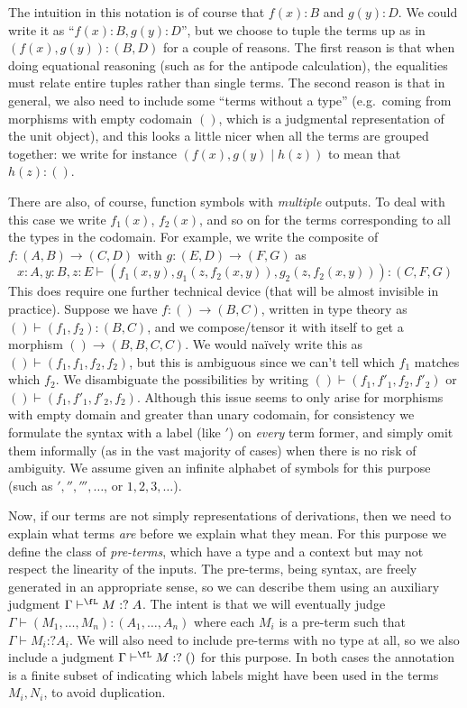 \documentclass{book}
\let\types\vdash
\newcommand{\pc}{\mathrel{\mathord{:}?}}
\begin{document}
The intuition in this notation is of course that $f(x):B$ and $g(y):D$.
We could write it as ``$f(x):B,g(y):D$'', but we choose to tuple the terms up as in $(f(x),g(y)):(B,D)$ for a couple of reasons.
The first reason is that when doing equational reasoning (such as for the antipode calculation), the equalities must relate entire tuples rather than single terms.
The second reason is that in general, we also need to include some ``terms without a type'' (e.g.\ coming from morphisms with empty codomain $()$, which is a judgmental representation of the unit object), and this looks a little nicer when all the terms are grouped together: we write for instance $(f(x),g(y)\mid h(z))$ to mean that $h(z):()$.

There are also, of course, function symbols with \emph{multiple} outputs.
To deal with this case we write $f_1(x)$, $f_2(x)$, and so on for the terms corresponding to all the types in the codomain.
For example, we write the composite of $f:(A,B) \to (C,D)$ with $g:(E,D)\to (F,G)$ as
\[ x:A, y:B, z:E \types (f_1(x,y),g_1(z,f_2(x,y)),g_2(z,f_2(x,y))):(C,F,G) \]
This does require one further technical device (that will be almost invisible in practice).
Suppose we have $f:()\to (B,C)$, written in type theory as $()\types (f_1,f_2):(B,C)$, and we compose/tensor it with itself to get a morphism $() \to (B,B,C,C)$.
We would na\"ively write this as $() \types (f_1,f_1,f_2,f_2)$, but this is ambiguous since we can't tell which $f_1$ matches which $f_2$.
We disambiguate the possibilities by writing $() \types (f_1,f'_1,f_2,f'_2)$ or $() \types (f_1,f'_1,f'_2,f_2)$.
Although this issue seems to only arise for morphisms with empty domain and greater than unary codomain, for consistency we formulate the syntax with a label (like $'$) on \emph{every} term former, and simply omit them informally (as in the vast majority of cases) when there is no risk of ambiguity.
We assume given an infinite alphabet of symbols \fA for this purpose (such as $','',''',\dots$, or $1,2,3,\dots$).

Now, if our terms are not simply representations of derivations, then we need to explain what terms \emph{are} before we explain what they mean.
For this purpose we define the class of \emph{pre-terms}, which have a type and a context but may not respect the linearity of the inputs.
The pre-terms, being syntax, are freely generated in an appropriate sense, so we can describe them using an auxiliary judgment $\Gamma \types^\fL M\pc A$.
The intent is that we will eventually judge $\Gamma \types (M_1,\dots,M_n):(A_1,\dots,A_n)$ where each $M_i$ is a pre-term such that $\Gamma \types M_i\pc A_i$.
We will also need to include pre-terms with no type at all, so we also include a judgment $\Gamma \types^\fL M\pc ()$ for this purpose.
In both cases the annotation \fL is a finite subset of \fA indicating which labels might have been used in the terms $M_i,N_i$, to avoid duplication.
\end{document}
